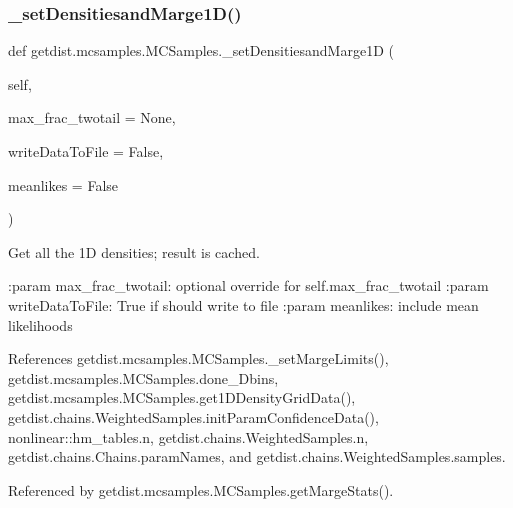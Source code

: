 \subsubsection{\texorpdfstring{\+\_\+set\+Densitiesand\+Marge1\+D()}{\_setDensitiesandMarge1D()}}
{\footnotesize\ttfamily def getdist.\+mcsamples.\+M\+C\+Samples.\+\_\+set\+Densitiesand\+Marge1D (\begin{DoxyParamCaption}\item[{}]{self,  }\item[{}]{max\+\_\+frac\+\_\+twotail = {\ttfamily None},  }\item[{}]{write\+Data\+To\+File = {\ttfamily False},  }\item[{}]{meanlikes = {\ttfamily False} }\end{DoxyParamCaption})\hspace{0.3cm}{\ttfamily [private]}}

\begin{DoxyVerb}Get all the 1D densities; result is cached.

:param max_frac_twotail: optional override for self.max_frac_twotail
:param writeDataToFile: True if should write to file
:param meanlikes: include mean likelihoods
\end{DoxyVerb}
 

References getdist.\+mcsamples.\+M\+C\+Samples.\+\_\+set\+Marge\+Limits(), getdist.\+mcsamples.\+M\+C\+Samples.\+done\+\_\+Dbins, getdist.\+mcsamples.\+M\+C\+Samples.\+get1\+D\+Density\+Grid\+Data(), getdist.\+chains.\+Weighted\+Samples.\+init\+Param\+Confidence\+Data(), nonlinear\+::hm\+\_\+tables.\+n, getdist.\+chains.\+Weighted\+Samples.\+n, getdist.\+chains.\+Chains.\+param\+Names, and getdist.\+chains.\+Weighted\+Samples.\+samples.



Referenced by getdist.\+mcsamples.\+M\+C\+Samples.\+get\+Marge\+Stats().

